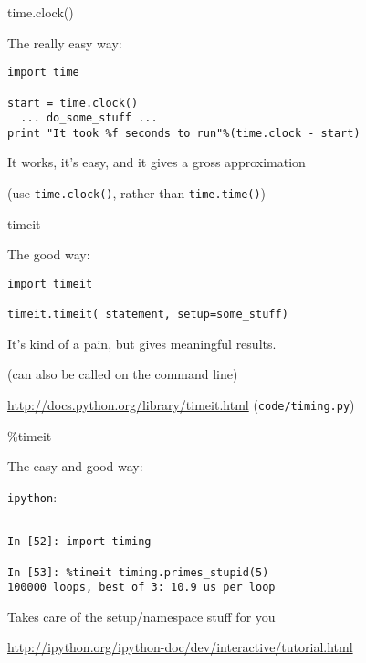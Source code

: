 \documentclass{beamer}
\begin{document}
\begin{frame}[fragile]{time.clock()}

{\Large The really easy way:}

\begin{verbatim}
import time

start = time.clock()
  ... do_some_stuff ...
print "It took %f seconds to run"%(time.clock - start)
\end{verbatim}

{\Large It works, it's easy, and it gives a gross approximation}

\vfill
(use \verb|time.clock()|, rather than \verb|time.time()|)

\end{frame} 

\begin{frame}[fragile]{timeit}

{\Large The good way:}

\begin{verbatim}
import timeit

timeit.timeit( statement, setup=some_stuff)

\end{verbatim}

{\Large It's kind of a pain, but gives meaningful results.}

(can also be called on the command line)

\vfill
\url{http://docs.python.org/library/timeit.html}
\vfill
(\verb|code/timing.py|)
\end{frame} 

\begin{frame}[fragile]{\%timeit}

{\Large The easy and good way:}

\vfill
{\LARGE \verb|ipython|:}
\begin{verbatim}

In [52]: import timing

In [53]: %timeit timing.primes_stupid(5)
100000 loops, best of 3: 10.9 us per loop

\end{verbatim}

{\Large Takes care of the setup/namespace stuff for you}

\vfill
\url{http://ipython.org/ipython-doc/dev/interactive/tutorial.html}
\end{frame} 
\end{document}
